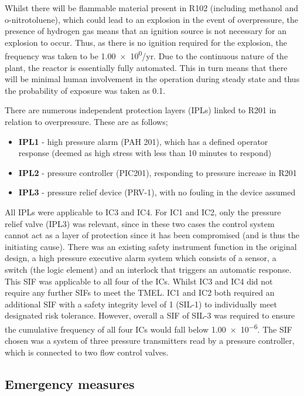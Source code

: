 Whilst there will be flammable material present in R102 (including methanol and o-nitrotoluene), which could lead to an explosion in the event of overpressure, the presence of hydrogen gas means that an ignition source is not necessary for an explosion to occur. Thus, as there is no ignition required for the explosion, the frequency was taken to be \num{1.00e0}/yr. Due to the continuous nature of the plant, the reactor is essentially fully automated. This in turn means that there will be minimal human involvement in the operation during steady state and thus the probability of exposure was taken as 0.1. 

There are numerous  independent protection layers (IPLs) linked to R201 in relation to overpressure. These are as follows;
 
 \begin{itemize}
\item \textbf{IPL1} - high pressure alarm (PAH 201), which has a defined operator response (deemed as high stress with less than 10 minutes to respond)
\item  \textbf{IPL2} - pressure controller (PIC201), responding to pressure increase in R201
\item  \textbf{IPL3} - pressure relief device (PRV-1), with no fouling in the device assumed
 \end{itemize}

All IPLs were applicable to IC3 and IC4. For IC1 and IC2, only the pressure relief valve (IPL3) was relevant, since in these two cases the control system cannot act as a layer of protection since it has been compromised (and is thus the initiating cause). There was an existing safety instrument function in the original design, a high pressure executive alarm system which consists of a sensor, a switch (the logic element) and an interlock that triggers an automatic response. This SIF was applicable to all four of the ICs. Whilst IC3 and IC4 did not require any further SIFs to meet the TMEL. IC1 and IC2 both required an additional SIF with a safety integrity level of 1 (SIL-1) to individually meet designated risk tolerance. However, overall a SIF of SIL-3 was required to ensure the cumulative frequency of all four ICs would fall below \num{1.00e-6}. The SIF chosen was a system of three pressure transmitters read by a pressure controller, which is connected to two flow control valves. 


\subsection{Emergency measures }

